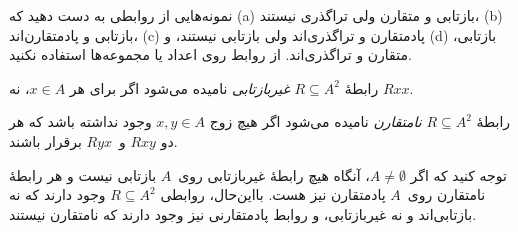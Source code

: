 \documentclass[../../../include/open-logic-section]{subfiles}
\begin{document}
\begin{prob}
نمونه‌هایی از روابطی به دست دهید که (a) بازتابی و متقارن ولی
تراگذری نیستند، (b) بازتابی و پادمتقارن‌اند، (c) پادمتقارن و تراگذری‌اند
ولی بازتابی نیستند، و (d) بازتابی، متقارن و تراگذری‌اند. از روابط روی اعداد
یا مجموعه‌ها استفاده نکنید.
\end{prob}

\begin{defn}
رابطهٔ $R \subseteq A^2$ \emph{غیربازتابی} نامیده می‌شود اگر برای هر $x \in
A$، نه $Rxx$.
\end{defn}

\begin{defn}[نامتقارنی]
رابطهٔ $R \subseteq A^2$ \emph{نامتقارن} نامیده می‌شود اگر هیچ زوج $x,y\in
A$ وجود نداشته باشد که هر دو $Rxy$ و~$Ryx$ برقرار باشند.
\end{defn}

توجه کنید که اگر $A \neq \emptyset$، آنگاه هیچ رابطهٔ غیربازتابی
روی~$A$ بازتابی نیست و هر رابطهٔ نامتقارن روی~$A$ پادمتقارن نیز هست.
بااین‌حال، روابطی $R \subseteq A^2$ وجود دارند که نه بازتابی‌اند و نه
غیربازتابی، و روابط پادمتقارنی نیز وجود دارند که نامتقارن نیستند.
\end{document}
